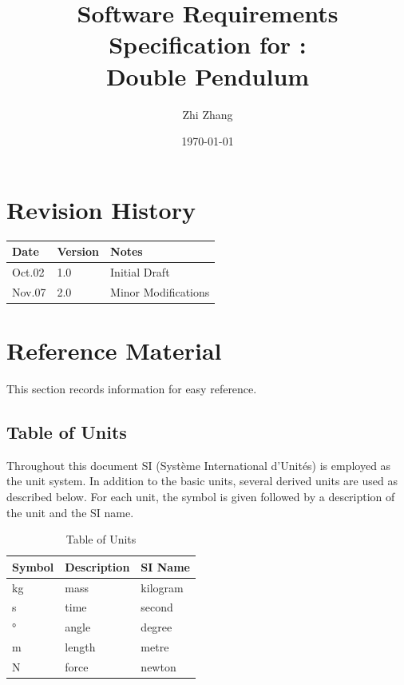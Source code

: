 \documentclass[12pt]{article}
\begin{document}
\title{Software Requirements Specification for : \\Double Pendulum} 
\author{Zhi Zhang}
\date{\today}
  
\maketitle

\newpage


\tableofcontents

\newpage

\section*{Revision History}\label{sec_revision}

\begin{tabularx}{\textwidth}{p{3cm}p{2cm}X}
\toprule {\bf Date} & {\bf Version} & {\bf Notes}\\
\midrule
Oct.02 & 1.0 & Initial Draft\\
Nov.07 & 2.0 & Minor Modifications\\
\bottomrule
\end{tabularx}


\newpage
\section{Reference Material}\label{sec_ref}

This section records information for easy reference.

\subsection{Table of Units}\label{sec_tableofunits}

Throughout this document SI (Syst\`{e}me International d'Unit\'{e}s) is employed
as the unit system. In addition to the basic units, several derived units are
used as described below. For each unit, the symbol is given followed by a
description of the unit and the SI name.
~\newline

\renewcommand{\arraystretch}{1.2}
\begin{table}[H]
\centering
  \noindent \begin{tabular}{l l l} 
    \toprule    
    \textbf{Symbol} & \textbf{Description} & \textbf{SI Name}\\
    \midrule 
    \si{\kilogram} & mass & kilogram\\
    \si{\second} & time & second\\
    \si{\degree} & angle & degree\\
    \si{\metre} & length & metre\\
    \si{\newton} & force & newton\\
    \bottomrule

  \end{tabular}
  \caption{Table of Units}
\end{table}
\end{document}
